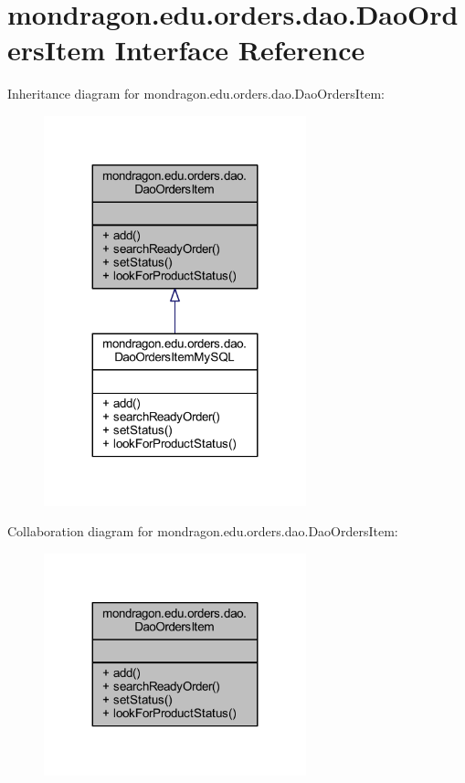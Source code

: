 \hypertarget{interfacemondragon_1_1edu_1_1orders_1_1dao_1_1_dao_orders_item}{}\section{mondragon.\+edu.\+orders.\+dao.\+Dao\+Orders\+Item Interface Reference}
\label{interfacemondragon_1_1edu_1_1orders_1_1dao_1_1_dao_orders_item}


Inheritance diagram for mondragon.\+edu.\+orders.\+dao.\+Dao\+Orders\+Item\+:\nopagebreak
\begin{figure}[H]
\begin{center}
\leavevmode
\includegraphics[width=215pt]{interfacemondragon_1_1edu_1_1orders_1_1dao_1_1_dao_orders_item__inherit__graph}
\end{center}
\end{figure}


Collaboration diagram for mondragon.\+edu.\+orders.\+dao.\+Dao\+Orders\+Item\+:\nopagebreak
\begin{figure}[H]
\begin{center}
\leavevmode
\includegraphics[width=215pt]{interfacemondragon_1_1edu_1_1orders_1_1dao_1_1_dao_orders_item__coll__graph}
\end{center}
\end{figure}
